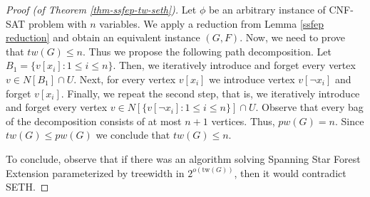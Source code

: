 \documentclass[en]{pracamgr}
\newcommand{\ssfep}{{\sc Spanning Star Forest Extension}}
\newcommand{\cnfsat}{{\sc CNF-SAT}}
\newcommand{\tw}{\textrm{tw}}
\begin{document}
\begin{proof}[Proof (of Theorem \ref{thm-ssfep-tw-seth})]
	Let $\phi$ be an arbitrary instance of \cnfsat{} problem with $n$ variables. We apply a reduction from Lemma \ref{ssfep reduction} and obtain an equivalent instance $(G,F)$. Now, we need to prove that $tw(G) \leq n$. Thus we propose the following path decomposition. Let $B_1=\{v[x_i]: 1 \leq i \leq n\}$. Then, we iteratively introduce and forget every vertex $v \in N[B_1] \cap U$. Next, for every vertex $v[x_i]$ we introduce vertex $v[\neg x_i]$ and forget $v[x_i]$. Finally, we repeat the second step, that is, we iteratively introduce and forget every vertex $v \in N[\{v[\neg x_i]: 1 \leq i \leq n\}] \cap U$. Observe that every bag of the decomposition consists of at most $n+1$ vertices. Thus, $pw(G)=n$. Since $tw(G) \leq pw(G)$ we conclude that $tw(G) \leq n$.
	
	To conclude, observe that if there was an algorithm solving \ssfep{} parameterized by treewidth in $2^{o(\tw(G))}$, then it would contradict SETH.
\end{proof}

\begin{thebibliography}{99}


\end{thebibliography}
\end{document}
